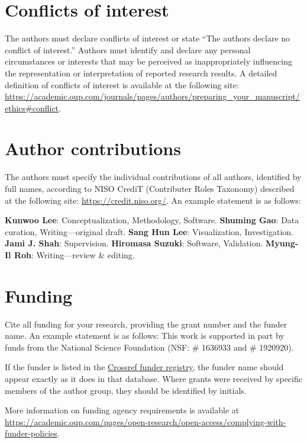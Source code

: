 \section*{Conflicts of interest} 
The authors must declare conflicts of interest or state “The authors declare no conflict of interest.” Authors must identify and declare any personal circumstances or interests that may be perceived as inappropriately influencing the representation or interpretation of reported research results. A detailed definition of conflicts of interest is available at the following site: \url{https://academic.oup.com/journals/pages/authors/preparing_your_manuscript/ethics#conflict}.

\section*{Author contributions}
The authors must specify the individual contributions of all authors, identified by full names, according to NISO CrediT (Contributer Roles Taxonomy) described at the following site: \url{https://credit.niso.org/}. An example statement is as follows:

\noindent\textbf{Kunwoo Lee}: Conceptualization, Methodology, Software. \textbf{Shuming Gao}: Data curation, Writing—original draft. \textbf{Sang Hun Lee}: Visualization, Investigation. \textbf{Jami J. Shah}: Supervision. \textbf{Hiromasa Suzuki}: Software, Validation. \textbf{Myung-Il Roh}: Writing—review \& editing.

\section*{Funding}
Cite all funding for your research, providing the grant number and the funder name. An example statement is as follows: This work is supported in part by funds from the National Science Foundation (NSF: \# 1636933 and \# 1920920). 

If the funder is listed in the \href{https://www.crossref.org/services/funder-registry/}{Crossref funder registry}, the funder name should appear exactly as it does in that database. Where grants were received by specific members of the author group, they should be identified by initials. 

More information on funding agency requirements is available at  \url{https://academic.oup.com/pages/open-research/open-access/complying-with-funder-policies}.

